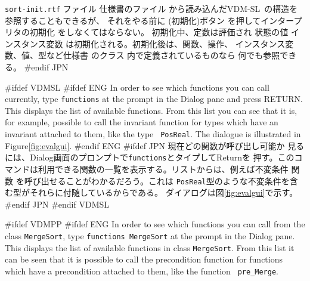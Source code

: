 \documentclass[\pformat,12pt]{article}
\newcommand{\vdmslpp}{VDM-SL}
\newcommand{\vdmslpp}{VDM++}
\newcommand{\aaa}{\tt }
\newcommand{\cmd}{\tt }
\newcommand{\guicmd}[1]{{\sf #1}}
\newcommand{\guicmd}[1]{{\gt #1}}
\begin{document}
{
{\tt sort-init.rtf} ファイル
}
{
仕様書のファイル
}
から読み込んだ\vdmslpp\ の構造を参照することもできるが、
それをやる前に  
(\guicmd{初期化})ボタン を押してインタープリタの初期化 をしなくてはならない。
初期化中、定数は評価され
{
状態の値
}
{
インスタンス変数
}
は初期化される。初期化後は、関数、操作、
インスタンス変数、値、型など仕様書
{
}
{
のクラス
}内で定義されているものなら
何でも参照できる。 
#endif JPN

#ifdef VDMSL 
#ifdef ENG
In order to see which functions
you can call 
currently, type {\tt functions} at the prompt in the \guicmd{Dialog}
pane and press RETURN. This displays the list of available
functions. From this list you can see that it is, for example,
possible to call the invariant function for
types which have an invariant attached to them, like the type {\aaa
  PosReal}. The dialogue is illustrated in Figure\ref{fig:evalgui}.
#endif ENG
#ifdef JPN
現在どの関数が呼び出し可能か
見るには、\guicmd{Dialog}画面のプロンプトで{\tt functions}とタイプしてReturnを
押す。このコマンドは利用できる関数の一覧を表示する。リストからは、例えば不変条件
関数
を呼び出せることがわかるだろう。これは
{\aaa PosReal}型のような不変条件を含む型がそれらに付随しているからである。
ダイアログは図\ref{fig:evalgui}で示す。
#endif JPN
#endif VDMSL

#ifdef VDMPP
#ifdef ENG
In order to see which functions you can call from the class
{\aaa MergeSort}, type {\cmd functions MergeSort} at the
prompt in the
\guicmd{Dialog} pane.  This displays the list of available functions
in class {\aaa MergeSort}.  From this list it can be seen that it is
possible to call the precondition
function for functions which
have a precondition attached to them, like the function {\aaa
  pre\_Merge}.
\end{document}
